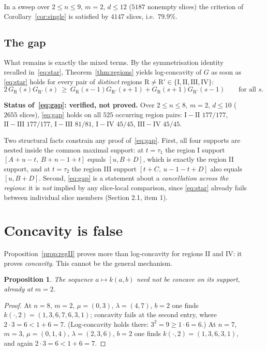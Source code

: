 \documentclass[11pt]{article}
\theoremstyle{plain}
\newtheorem{proposition}[theorem]{Proposition}
\theoremstyle{definition}
\begin{document}
In a sweep over $2\le n\le9$, $m=2$, $d\le12$ ($5187$ nonempty slices) the criterion of
Corollary~\ref{cor:single} is satisfied by $4147$ slices, i.e.\ $79.9\%$.

\subsection{The gap}\label{sec:gap}

What remains is exactly the mixed terms. By the symmetrisation identity recalled
in~\eqref{eq:star}, Theorem~\ref{thm:regions} yields log-concavity of $G$ as soon as
\eqref{eq:star} holds for every pair of \emph{distinct} regions
$\mathrm R\ne\mathrm R'\in\{\mathrm I,\mathrm{II},\mathrm{III},\mathrm{IV}\}$:
\begin{equation}\label{eq:gap}
 2\,G_{\mathrm R}(s)G_{\mathrm R'}(s)\ \ge\
 G_{\mathrm R}(s-1)G_{\mathrm R'}(s+1)+G_{\mathrm R}(s+1)G_{\mathrm R'}(s-1)
 \qquad\text{for all }s.
\end{equation}

\textbf{Status of~\eqref{eq:gap}: verified, not proved.} Over $2\le n\le8$, $m=2$,
$d\le10$ ($2655$ slices), \eqref{eq:gap} holds on all $525$ occurring region pairs:
$\mathrm{I}\!-\!\mathrm{II}$ $177/177$, $\mathrm{II}\!-\!\mathrm{III}$ $177/177$,
$\mathrm{I}\!-\!\mathrm{III}$ $81/81$, $\mathrm{I}\!-\!\mathrm{IV}$ $45/45$,
$\mathrm{III}\!-\!\mathrm{IV}$ $45/45$.

Two structural facts constrain any proof of~\eqref{eq:gap}. First, all four supports are
nested inside the common maximal support: at $t=\tau_1$ the region I support
$[A+u-t,\ B+n-1+t]$ equals $[u,B+D]$, which is exactly the region II support, and at
$t=\tau_2$ the region III support $[t+C,\ u-1-t+D]$ also equals $[u,B+D]$. Second,
\eqref{eq:gap} is a statement about a \emph{cancellation across the regions}: it is
\emph{not} implied by any slice-local comparison, since \eqref{eq:star} already fails
between individual slice members (Section 2.1, item 1).

\section{Concavity is false}\label{sec:conc}

Proposition~\ref{prop:regII} proves more than log-concavity for regions II and IV: it
proves \emph{concavity}. This cannot be the general mechanism.

\begin{proposition}\label{prop:notconc}
The sequence $a\mapsto k(a,b)$ need not be concave on its support, already at $m=2$.
\end{proposition}
\begin{proof}
At $n=8$, $m=2$, $\mu=(0,3)$, $\lambda=(4,7)$, $b=2$ one finds
$k(\cdot,2)=(1,3,6,7,6,3,1)$; concavity fails at the second entry, where
$2\cdot3=6<1+6=7$. (Log-concavity holds there: $3^2=9\ge1\cdot6=6$.)
At $n=7$, $m=3$, $\mu=(0,1,4)$, $\lambda=(2,3,6)$, $b=2$ one finds $k(\cdot,2)=(1,3,6,3,1)$,
and again $2\cdot3=6<1+6=7$.
\end{proof}
\end{document}
